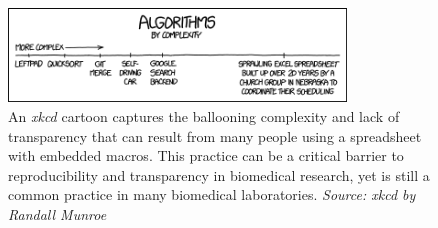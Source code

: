 \documentclass[pdftex,english,11pt,parskip=half]{scrartcl}
\begin{document}
\begin{figure}[b]
\centering
\includegraphics[width = 0.8\textwidth]{figures/algorithms.png}
\caption{An \textit{xkcd} cartoon captures the ballooning complexity and lack of transparency that can result from many people using a spreadsheet with embedded macros. This practice can be a critical barrier to reproducibility and transparency in biomedical research, yet is still a common practice in many biomedical laboratories. \textit{Source: xkcd by Randall Munroe}}
\label{fig:spreadsheet}
\end{figure}
\end{document}
